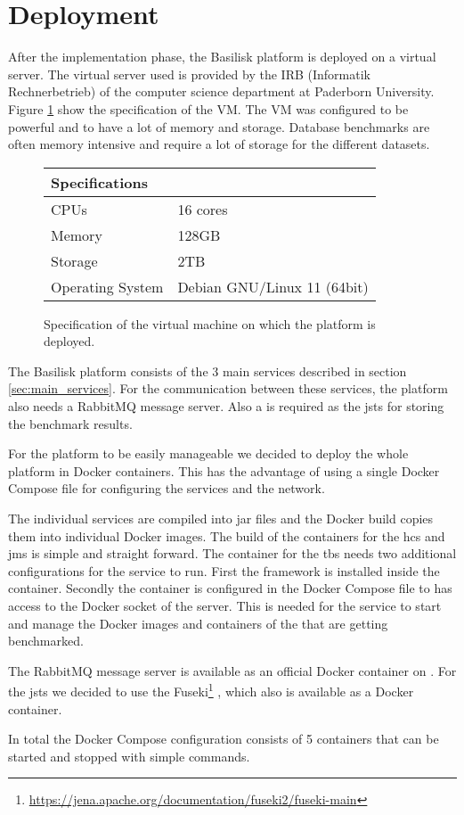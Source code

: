 \section{Deployment}
\label{sec:deployment}
After the implementation phase, the Basilisk platform is deployed on a virtual server.
The virtual server used is provided by the IRB (Informatik Rechnerbetrieb) of the computer science department at Paderborn University.
Figure \ref{fig:vm_specs} show the specification of the VM.
The VM was configured to be powerful and to have a lot of memory and storage.
Database benchmarks are often memory intensive and require a lot of storage for the different datasets.

\begin{figure}[tbph]
	\centering
	\begin{tabular}{ll}
		\toprule
		\textbf{Specifications} &                             \\ \midrule
		CPUs                    & 16 cores                    \\ \midrule
		Memory                  & 128GB                       \\ \midrule
		Storage                 & 2TB                         \\ \midrule
		Operating System        & Debian GNU/Linux 11 (64bit) \\ \bottomrule
	\end{tabular}
	\caption{Specification of the virtual machine on which the platform is deployed.}
	\label{fig:vm_specs}
\end{figure}

The Basilisk platform consists of the 3 main services described in section \ref{sec:main_services}.
For the communication between these services, the platform also needs a RabbitMQ message server.
Also a \ts{} is required as the \acl{jsts} for storing the benchmark results.

For the platform to be easily manageable we decided to deploy the whole platform in Docker containers.
This has the advantage of using a single Docker Compose file for configuring the services and the network.

The individual services are compiled into jar files and the Docker build copies them into individual Docker images.
The build of the containers for the \ac{hcs} and \ac{jms} is simple and straight forward.
The container for the \ac{tbs} needs two additional configurations for the service to run.
First the \iguana{} framework is installed inside the container.
Secondly the container is configured in the Docker Compose file to has access to the Docker socket of the server.
This is needed for the service to start and manage the Docker images and containers of the \tsp{} that are getting benchmarked.

The RabbitMQ message server is available as an official Docker container on \dockh{}.
For the \ac{jsts} we decided to use the Fuseki\footnote{\url{https://jena.apache.org/documentation/fuseki2/fuseki-main}} \ts{}, which also is available as a Docker container.

In total the Docker Compose configuration consists of 5 containers that can be started and stopped with simple commands.

